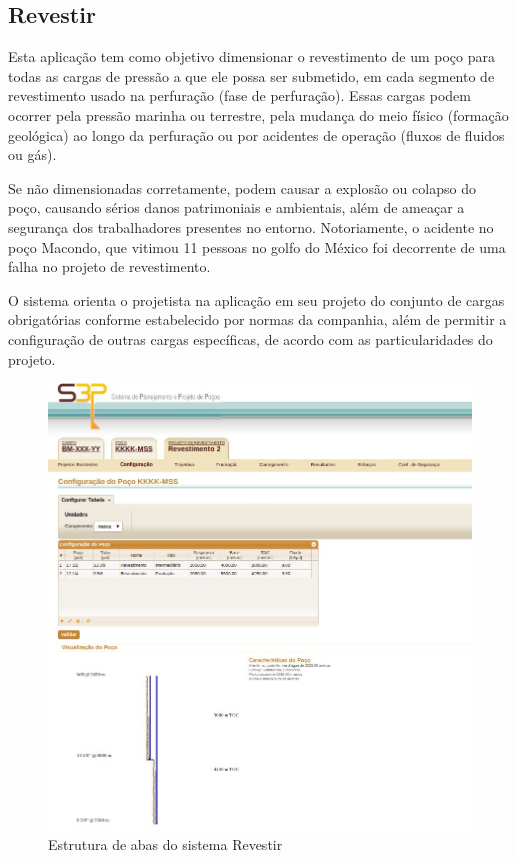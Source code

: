 \documentclass[]{article}
\begin{document}
\subsection{Revestir}

Esta aplicação tem como objetivo dimensionar o revestimento de um poço para todas as cargas de pressão a que ele possa ser submetido, em cada segmento de revestimento usado na perfuração (fase de perfuração). Essas cargas podem ocorrer pela pressão marinha ou terrestre, pela mudança do meio físico (formação geológica) ao longo da perfuração ou por acidentes de operação (fluxos de fluidos ou gás).

Se não dimensionadas corretamente, podem causar a explosão ou colapso do poço, causando sérios danos patrimoniais e ambientais, além de ameaçar a segurança dos trabalhadores presentes no entorno. Notoriamente, o acidente no poço Macondo, que vitimou 11 pessoas no golfo do México foi decorrente de uma falha no projeto de revestimento. \cite{Brown:2010:Online}

O sistema orienta o projetista na aplicação em seu projeto do conjunto de cargas obrigatórias conforme estabelecido por normas da companhia, além de permitir a configuração de outras cargas específicas, de acordo com as particularidades do projeto.

\begin{figure}[!ht]
\centering
\includegraphics[scale=.5]{./s3p}
\caption{Estrutura de abas do sistema Revestir}
\label{fig:s3p}
\end{figure}
\end{document}
